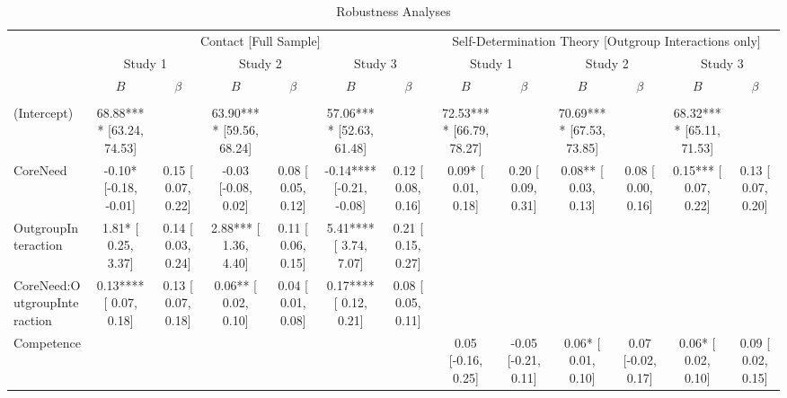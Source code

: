 \begin{table}
\begin{minipage}[t][\textheight][t]{\textwidth}

\caption{\label{tab:robustnessTbl}Robustness Analyses}
\centering
\begin{tabular}[t]{lcccccccccccc}
\toprule
\multicolumn{1}{c}{} & \multicolumn{6}{c}{Contact [Full Sample]} & \multicolumn{6}{c}{Self-Determination Theory [Outgroup Interactions only]} \\
\cmidrule(l{3pt}r{3pt}){2-7} \cmidrule(l{3pt}r{3pt}){8-13}
\multicolumn{1}{c}{} & \multicolumn{2}{c}{Study 1} & \multicolumn{2}{c}{Study 2} & \multicolumn{2}{c}{Study 3} & \multicolumn{2}{c}{Study 1} & \multicolumn{2}{c}{Study 2} & \multicolumn{2}{c}{Study 3} \\
\cmidrule(l{3pt}r{3pt}){2-3} \cmidrule(l{3pt}r{3pt}){4-5} \cmidrule(l{3pt}r{3pt}){6-7} \cmidrule(l{3pt}r{3pt}){8-9} \cmidrule(l{3pt}r{3pt}){10-11} \cmidrule(l{3pt}r{3pt}){12-13}
 & $B$ & $\beta$ & $B$ & $\beta$ & $B$ & $\beta$ & $B$ & $\beta$ & $B$ & $\beta$ & $B$ & $\beta$\\
\midrule
\addlinespace[0.3em]
\multicolumn{13}{l}{\textbf{Fixed}}\\
\hspace{1em}(Intercept) & 68.88**** [63.24, 74.53] &  & 63.90**** [59.56, 68.24] &  & 57.06**** [52.63, 61.48] &  & 72.53**** [66.79, 78.27] &  & 70.69**** [67.53, 73.85] &  & 68.32**** [65.11, 71.53] & \\
\hspace{1em}CoreNeed & -0.10* [-0.18, -0.01] & 0.15 [ 0.07, 0.22] & -0.03 [-0.08,  0.02] & 0.08 [ 0.05, 0.12] & -0.14**** [-0.21, -0.08] & 0.12 [ 0.08, 0.16] & 0.09* [ 0.01,  0.18] & 0.20 [ 0.09, 0.31] & 0.08** [ 0.03,  0.13] & 0.08 [ 0.00, 0.16] & 0.15*** [ 0.07,  0.22] & 0.13 [ 0.07, 0.20]\\
\hspace{1em}OutgroupInteraction & 1.81* [ 0.25,  3.37] & 0.14 [ 0.03, 0.24] & 2.88*** [ 1.36,  4.40] & 0.11 [ 0.06, 0.15] & 5.41**** [ 3.74,  7.07] & 0.21 [ 0.15, 0.27] &  &  &  &  &  & \\
\hspace{1em}CoreNeed:OutgroupInteraction & 0.13**** [ 0.07,  0.18] & 0.13 [ 0.07, 0.18] & 0.06** [ 0.02,  0.10] & 0.04 [ 0.01, 0.08] & 0.17**** [ 0.12,  0.21] & 0.08 [ 0.05, 0.11] &  &  &  &  &  & \\
\hspace{1em}Competence &  &  &  &  &  &  & 0.05 [-0.16,  0.25] & -0.05 [-0.21, 0.11] & 0.06* [ 0.01,  0.10] & 0.07 [-0.02, 0.17] & 0.06* [ 0.02,  0.10] & 0.09 [ 0.02, 0.15]\\

\end{tabular}
\end{minipage}
\end{table}
